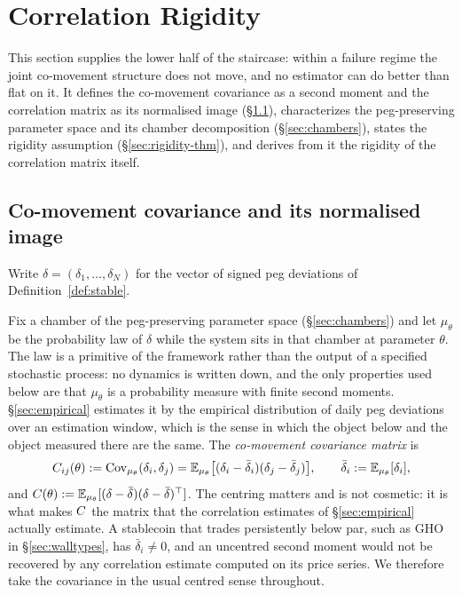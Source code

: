 
\section{Correlation Rigidity}\label{sec:rigidity}
This section supplies the lower half of the staircase: within a failure regime the joint co-movement structure does not move, and no estimator can do better than flat on it. It defines the co-movement covariance as a second moment and the correlation matrix as its normalised image (\S\ref{sec:vfc-int}), characterizes the peg-preserving parameter space and its chamber decomposition (\S\ref{sec:chambers}), states the rigidity assumption (\S\ref{sec:rigidity-thm}), and derives from it the rigidity of the correlation matrix itself.

\subsection{Co-movement covariance and its normalised image}\label{sec:vfc-int}
Write $\delta = (\delta_1,\ldots,\delta_N)$ for the vector of signed peg deviations of Definition~\ref{def:stable}.

\begin{definition}\label{def:intensity}
Fix a chamber of the peg-preserving parameter space (\S\ref{sec:chambers}) and let $\mu_\theta$ be the probability law of $\delta$ while the system sits in that chamber at parameter $\theta$. The law is a primitive of the framework rather than the output of a specified stochastic process: no dynamics is written down, and the only properties used below are that $\mu_\theta$ is a probability measure with finite second moments. \S\ref{sec:empirical} estimates it by the empirical distribution of daily peg deviations over an estimation window, which is the sense in which the object below and the object measured there are the same. The \emph{co-movement covariance matrix} is
\[
C_{ij}(\theta) := \operatorname{Cov}_{\mu_\theta}(\delta_i,\delta_j)
= \mathbb{E}_{\mu_\theta}\bigl[(\delta_i - \bar\delta_i)(\delta_j - \bar\delta_j)\bigr], \qquad \bar\delta_i := \mathbb{E}_{\mu_\theta}[\delta_i],
\]
and $C(\theta) := \mathbb{E}_{\mu_\theta}[(\delta - \bar\delta)(\delta - \bar\delta)^\top]$. The centring matters and is not cosmetic: it is what makes $C$ the matrix that the correlation estimates of \S\ref{sec:empirical} actually estimate. A stablecoin that trades persistently below par, such as GHO in \S\ref{sec:walltypes}, has $\bar\delta_i \ne 0$, and an uncentred second moment would not be recovered by any correlation estimate computed on its price series. We therefore take the covariance in the usual centred sense throughout.
\end{definition}

